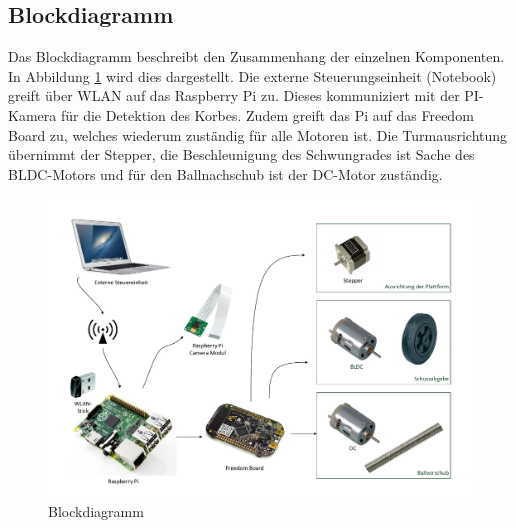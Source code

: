 \subsection{Blockdiagramm}
Das Blockdiagramm beschreibt den Zusammenhang der einzelnen Komponenten. In Abbildung \ref{fig:blockdiagramm} wird dies dargestellt. Die externe Steuerungseinheit (Notebook) greift über WLAN auf das Raspberry Pi zu. Dieses kommuniziert mit der PI-Kamera für die Detektion des Korbes. Zudem greift das Pi auf das Freedom Board zu, welches wiederum zuständig für alle Motoren ist. Die Turmausrichtung übernimmt der Stepper, die Beschleunigung des Schwungrades ist Sache des BLDC-Motors und für den Ballnachschub ist der DC-Motor zuständig.

\begin{figure}[h!]
\centering
\includegraphics[width=0.9\linewidth]{../../fig/blockdiagramm}
\caption{Blockdiagramm}
\label{fig:blockdiagramm}
\end{figure}
